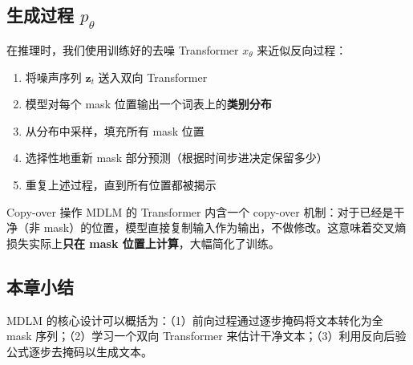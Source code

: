 \subsection{生成过程 $p_\theta$}

在推理时，我们使用训练好的去噪 Transformer $x_\theta$ 来近似反向过程：

\begin{enumerate}
    \item 将噪声序列 $\mathbf{z}_t$ 送入双向 Transformer
    \item 模型对每个 mask 位置输出一个词表上的\textbf{类别分布}
    \item 从分布中采样，填充所有 mask 位置
    \item 选择性地重新 mask 部分预测（根据时间步进决定保留多少）
    \item 重复上述过程，直到所有位置都被揭示
\end{enumerate}

\begin{knowledgebox}{Copy-over 操作}
MDLM 的 Transformer 内含一个 copy-over 机制：对于已经是干净（非 mask）的位置，模型直接复制输入作为输出，不做修改。这意味着交叉熵损失实际上\textbf{只在 mask 位置上计算}，大幅简化了训练。
\end{knowledgebox}

\subsection{本章小结}

MDLM 的核心设计可以概括为：（1）前向过程通过逐步掩码将文本转化为全 mask 序列；（2）学习一个双向 Transformer 来估计干净文本；（3）利用反向后验公式逐步去掩码以生成文本。

\newpage
